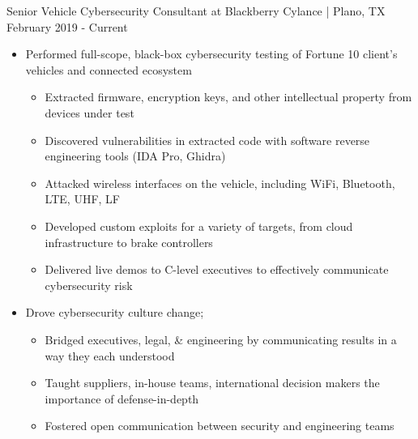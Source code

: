 Senior Vehicle Cybersecurity Consultant at Blackberry Cylance | Plano, TX
\hfill
February 2019 - Current
\begin{itemize}
			\item Performed full-scope, black-box cybersecurity testing of Fortune 10 client's vehicles and connected ecosystem
    \begin{itemize}
			\item Extracted firmware, encryption keys, and other intellectual property from devices under test
			\item Discovered vulnerabilities in extracted code with software reverse engineering tools (IDA Pro, Ghidra)
			\item Attacked wireless interfaces on the vehicle, including WiFi, Bluetooth, LTE, UHF, LF
			\item Developed custom exploits for a variety of targets, from cloud infrastructure to brake controllers
			\item Delivered live demos to C-level executives to effectively communicate cybersecurity risk
    \end{itemize}
		\item Drove cybersecurity culture change; 
    \begin{itemize}
		\item Bridged executives, legal, \& engineering by communicating results in a way they each understood
		\item Taught suppliers, in-house teams, international decision makers the importance of defense-in-depth
		\item Fostered open communication between security and engineering teams
    \end{itemize}
\end{itemize}
